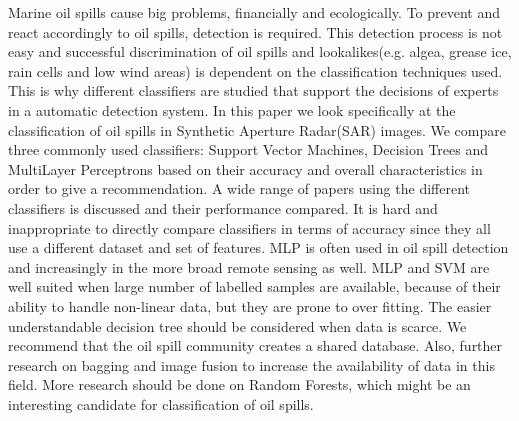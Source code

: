 Marine oil spills cause big problems, financially and ecologically. To prevent and react accordingly to oil spills, detection is required. This detection process is not easy and successful discrimination of oil spills and lookalikes(e.g. algea, grease ice, rain cells and low wind areas) is dependent on the classification techniques used. This is why different classifiers are studied that support the decisions of experts in a automatic detection system. In this paper we look specifically at the classification of oil spills in Synthetic Aperture Radar(SAR) images. We compare three commonly used classifiers: Support Vector Machines, Decision Trees and MultiLayer Perceptrons based on their accuracy and overall characteristics in order to give a recommendation. A wide range of papers using the different classifiers is discussed and their performance compared. It is hard and inappropriate to directly compare classifiers in terms of accuracy since they all use a different dataset and set of features. MLP is often used in oil spill detection and increasingly in the more broad remote sensing as well. MLP and SVM are well suited when large number of labelled samples are available, because of their ability to handle non-linear data, but they are prone to over fitting. The easier understandable decision tree should be considered when data is scarce. We recommend that the oil spill community creates a shared database. Also, further research on bagging and image fusion to increase the availability of data in this field. More research should be done on Random Forests, which might be an interesting candidate for classification of oil spills.
